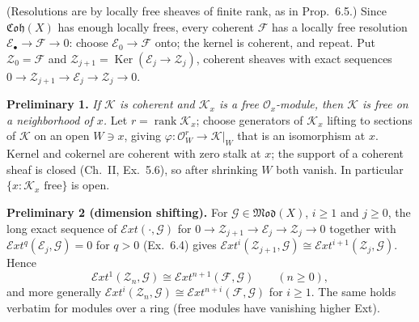 \documentclass[11pt]{article}
\begin{document}
\pf
(Resolutions are by locally free sheaves of finite rank, as in Prop.~6.5.) Since $\mathfrak{Coh}(X)$ has enough locally frees, every coherent $\mathcal F$ has a locally free resolution $\mathcal E_\bullet\to\mathcal F\to0$: choose $\mathcal E_0\to\mathcal F$ onto; the kernel is coherent, and repeat. Put $\mathcal Z_0=\mathcal F$ and $\mathcal Z_{j+1}=\operatorname{Ker}(\mathcal E_j\to\mathcal Z_j)$, coherent sheaves with exact sequences $0\to\mathcal Z_{j+1}\to\mathcal E_j\to\mathcal Z_j\to0$.

\textbf{Preliminary 1.} \emph{If $\mathcal K$ is coherent and $\mathcal K_x$ is a free $\mathcal O_x$-module, then $\mathcal K$ is free on a neighborhood of $x$.} Let $r=\operatorname{rank}\mathcal K_x$; choose generators of $\mathcal K_x$ lifting to sections of $\mathcal K$ on an open $W\ni x$, giving $\varphi\colon\mathcal O_W^r\to\mathcal K|_W$ that is an isomorphism at $x$. Kernel and cokernel are coherent with zero stalk at $x$; the support of a coherent sheaf is closed (Ch.~II, Ex.~5.6), so after shrinking $W$ both vanish. In particular $\{x:\mathcal K_x\text{ free}\}$ is open.

\textbf{Preliminary 2 (dimension shifting).} For $\mathcal G\in\mathfrak{Mod}(X)$, $i\ge1$ and $j\ge0$, the long exact sequence of $\mathcal{E}xt(\cdot,\mathcal G)$ for $0\to\mathcal Z_{j+1}\to\mathcal E_j\to\mathcal Z_j\to0$ together with $\mathcal{E}xt^q(\mathcal E_j,\mathcal G)=0$ for $q>0$ (Ex.~6.4) gives $\mathcal{E}xt^i(\mathcal Z_{j+1},\mathcal G)\cong\mathcal{E}xt^{i+1}(\mathcal Z_j,\mathcal G)$. Hence
\[
\mathcal{E}xt^1(\mathcal Z_n,\mathcal G)\cong\mathcal{E}xt^{n+1}(\mathcal F,\mathcal G)\qquad(n\ge0),\tag{1}
\]
and more generally $\mathcal{E}xt^i(\mathcal Z_n,\mathcal G)\cong\mathcal{E}xt^{n+i}(\mathcal F,\mathcal G)$ for $i\ge1$. The same holds verbatim for modules over a ring (free modules have vanishing higher Ext).
\end{document}
